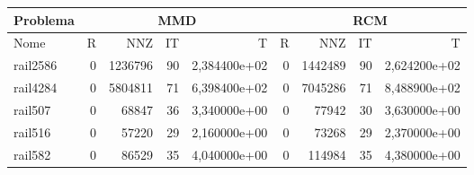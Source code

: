 \begin{tabular}{|l|r|r|r|r|r|r|r|r|}
\hline
\multicolumn{1}{|c|}{Problema} & \multicolumn{4}{|c|}{MMD} &         \multicolumn{4}{|c|}{RCM} \\ \hline
Nome & R & NNZ & IT & T & R & NNZ & IT & T \\ \hline
rail2586 & 0 & 1236796 & 90 & 2,384400e+02 & 0 & 1442489 & 90 & 2,624200e+02 \\ \hline
rail4284 & 0 & 5804811 & 71 & 6,398400e+02 & 0 & 7045286 & 71 & 8,488900e+02 \\ \hline
rail507 & 0 & 68847 & 36 & 3,340000e+00 & 0 & 77942 & 30 & 3,630000e+00 \\ \hline
rail516 & 0 & 57220 & 29 & 2,160000e+00 & 0 & 73268 & 29 & 2,370000e+00 \\ \hline
rail582 & 0 & 86529 & 35 & 4,040000e+00 & 0 & 114984 & 35 & 4,380000e+00 \\ \hline
\end{tabular}
